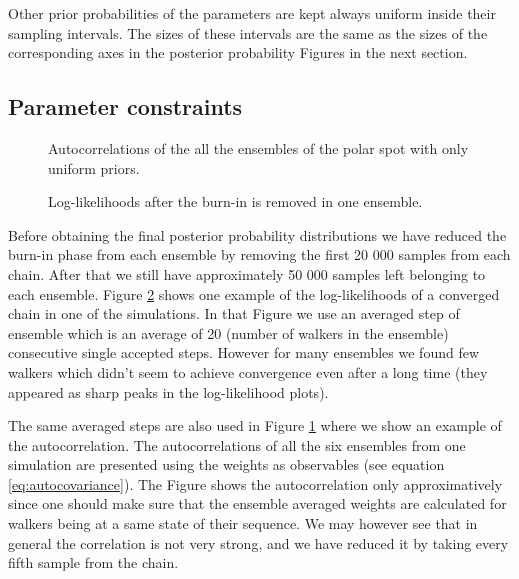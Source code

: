 \documentclass{wihuri}
\begin{document}
Other prior probabilities of the parameters are kept always uniform inside their sampling intervals. The sizes of these intervals are the same as the sizes of the corresponding axes in the posterior probability Figures in the next section. 



\subsection{Parameter constraints}

\begin{figure}
\centerline{}
\caption{Autocorrelations of the all the ensembles of the polar spot with only uniform priors.
\label{fig:acexample}}
\end{figure}


\begin{figure}
\centerline{}
\caption{Log-likelihoods after the burn-in is removed in one ensemble.
\label{fig:wexample}}
\end{figure}

Before obtaining the final posterior probability distributions we have reduced the burn-in phase from each ensemble by removing the first 20 000 samples from each chain. After that we still have approximately 50 000 samples left belonging to each ensemble.  Figure \ref{fig:wexample} shows one example of the log-likelihoods of a converged chain in one of the simulations. In that Figure we use an averaged step of ensemble which is an average of 20 (number of walkers in the ensemble) consecutive single accepted steps. However for many ensembles we found few walkers which didn't seem to achieve convergence even after a long time (they appeared as sharp peaks in the log-likelihood plots).

The same averaged steps are also used in Figure \ref{fig:acexample} where we show an example of the autocorrelation. The autocorrelations of all the six ensembles from one simulation are presented using the weights as observables (see equation \ref{eq:autocovariance}). The Figure shows the autocorrelation only approximatively since one should make sure that the ensemble averaged weights are calculated for walkers being at a same state of their sequence. We may however see that in general the correlation is not very strong, and we have reduced it by taking every fifth sample from the chain.%
\end{document}
